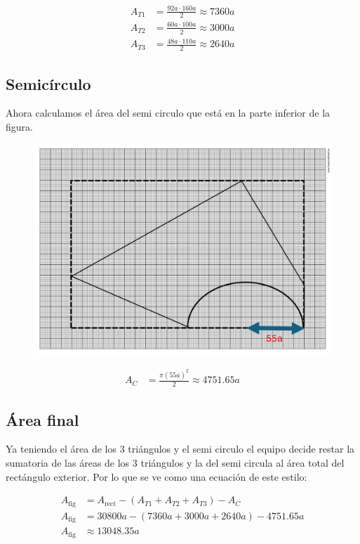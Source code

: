 \documentclass[12pt]{article}
\begin{document}
\begin{align*}
A_{T1} &= \frac{92a \cdot 160a}{2} \approx 7360a \\
A_{T2} &= \frac{60a \cdot 100a}{2} \approx 3000a \\
A_{T3} &= \frac{48a \cdot 110a}{2} \approx 2640a
\end{align*}

\subsection{Semicírculo}

Ahora calculamos el área del semi circulo que está en la parte inferior de la figura.

\begin{figure}[H]
    \centering
    \includegraphics[width=0.5\linewidth]{imagen 3.png}

\end{figure}

\begin{align*}
A_C &= \frac{\pi (55a)^2}{2} \approx 4751.65a
\end{align*}



\subsection{Área final}

Ya teniendo el área de los 3 triángulos y el semi circulo el equipo decide restar la sumatoria de las áreas de los 3 triángulos y la del semi circula al área total del rectángulo exterior.  Por lo que se ve como una ecuación de este estilo: 

\begin{align*}
A_\text{fig} &= A_\text{rect} - (A_{T1} + A_{T2} + A_{T3}) - A_C \\
A_\text{fig} &= 30800a - (7360a + 3000a + 2640a) - 4751.65a \\
A_\text{fig} &\approx 13048.35a
\end{align*}
\end{document}
